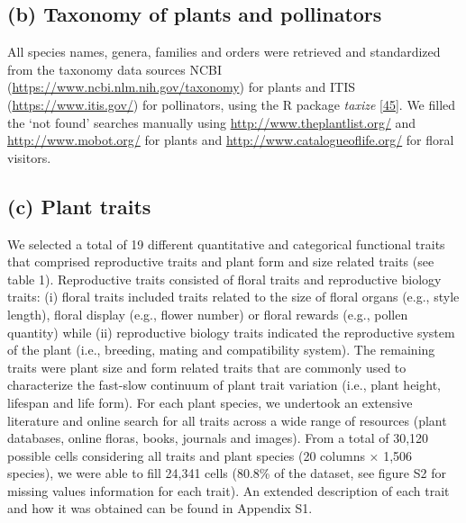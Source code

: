 \documentclass[
  12pt,
  a4paper,
]{article}
\begin{document}
\hypertarget{b-taxonomy-of-plants-and-pollinators}{%
\subsection{(b) Taxonomy of plants and pollinators}\label{b-taxonomy-of-plants-and-pollinators}}

All species names, genera, families and orders were retrieved and standardized from the taxonomy data sources NCBI (\url{https://www.ncbi.nlm.nih.gov/taxonomy}) for plants and ITIS (\url{https://www.itis.gov/}) for pollinators, using the R package \emph{taxize} {[}\protect\hyperlink{ref-chamberlain2020}{45}{]}. We filled the `not found' searches manually using \url{http://www.theplantlist.org/} and \url{http://www.mobot.org/} for plants and \url{http://www.catalogueoflife.org/} for floral visitors.

\hypertarget{c-plant-traits}{%
\subsection{(c) Plant traits}\label{c-plant-traits}}

We selected a total of 19 different quantitative and categorical functional traits that comprised reproductive traits and plant form and size related traits (see table 1). Reproductive traits consisted of floral traits and reproductive biology traits: (i) floral traits included traits related to the size of floral organs (e.g., style length), floral display (e.g., flower number) or floral rewards (e.g., pollen quantity) while (ii) reproductive biology traits indicated the reproductive system of the plant (i.e., breeding, mating and compatibility system). The remaining traits were plant size and form related traits that are commonly used to characterize the fast-slow continuum of plant trait variation (i.e., plant height, lifespan and life form). For each plant species, we undertook an extensive literature and online search for all traits across a wide range of resources (plant databases, online floras, books, journals and images). From a total of 30,120 possible cells considering all traits and plant species (20 columns × 1,506 species), we were able to fill 24,341 cells (80.8\% of the dataset, see figure S2 for missing values information for each trait). An extended description of each trait and how it was obtained can be found in Appendix S1.

\singlespacing
\end{document}
